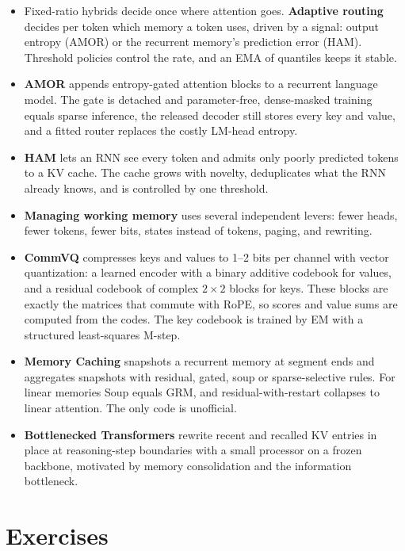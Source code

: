 \begin{summarybox}
\begin{itemize}
  \item Fixed-ratio hybrids decide once where attention goes. \textbf{Adaptive routing} decides per token
        which memory a token uses, driven by a signal: output entropy (AMOR) or the recurrent memory's
        prediction error (HAM). Threshold policies control the rate, and an EMA of quantiles keeps it stable.
  \item \textbf{AMOR} appends entropy-gated attention blocks to a recurrent language model. The gate is
        detached and parameter-free, dense-masked training equals sparse inference, the released decoder
        still stores every key and value, and a fitted router replaces the costly LM-head entropy.
  \item \textbf{HAM} lets an RNN see every token and admits only poorly predicted tokens to a KV cache.
        The cache grows with novelty, deduplicates what the RNN already knows, and is controlled by one
        threshold.
  \item \textbf{Managing working memory} uses several independent levers: fewer heads, fewer tokens,
        fewer bits, states instead of tokens, paging, and rewriting.
  \item \textbf{CommVQ} compresses keys and values to 1--2 bits per channel with vector quantization: a
        learned encoder with a binary additive codebook for values, and a residual codebook of complex
        $2\times2$ blocks for keys. These blocks are exactly the matrices that commute with RoPE, so scores
        and value sums are computed from the codes. The key codebook is trained by EM with a structured
        least-squares M-step.
  \item \textbf{Memory Caching} snapshots a recurrent memory at segment ends and aggregates snapshots
        with residual, gated, soup or sparse-selective rules. For linear memories Soup equals GRM, and
        residual-with-restart collapses to linear attention. The only code is unofficial.
  \item \textbf{Bottlenecked Transformers} rewrite recent and recalled KV entries in place at reasoning-step
        boundaries with a small processor on a frozen backbone, motivated by memory consolidation and
        the information bottleneck.
\end{itemize}
\end{summarybox}

\section*{Exercises}

